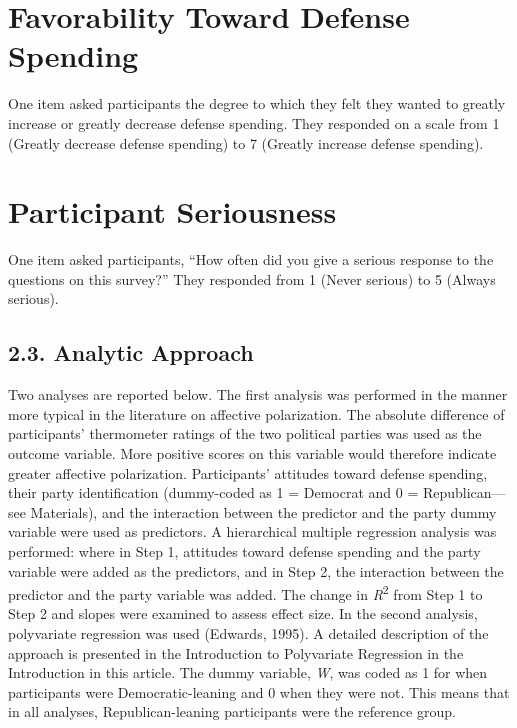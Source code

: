 \documentclass[authordate, meta, issue]{jote-new-article}
\begin{document}
	\section{\textbf{Favorability Toward Defense Spending}}



	One item asked participants the degree to which they felt they wanted to greatly increase or greatly decrease defense spending. They responded on a scale from 1 (Greatly decrease defense spending) to 7 (Greatly increase defense spending).



	\section{\textbf{Participant Seriousness}}



	One item asked participants, “How often did you give a serious response to the questions on this survey?” They responded from 1 (Never serious) to 5 (Always serious).



	\subsection{2.3. Analytic Approach}



	Two analyses are reported below. The first analysis was performed in the manner more typical in the literature on affective polarization. The absolute difference of participants' thermometer ratings of the two political parties was used as the outcome variable. More positive scores on this variable would therefore indicate greater affective polarization. Participants' attitudes toward defense spending, their party identification (dummy-coded as 1 = Democrat and 0 = Republican—see Materials), and the interaction between the predictor and the party dummy variable were used as predictors. A hierarchical multiple regression analysis was performed: where in Step 1, attitudes toward defense spending and the party variable were added as the predictors, and in Step 2, the interaction between the predictor and the party variable was added. The change in \emph{R}\textsuperscript{2} from Step 1 to Step 2 and slopes were examined to assess effect size. In the second analysis, polyvariate regression was used (Edwards, 1995). A detailed description of the approach is presented in the Introduction to Polyvariate Regression in the Introduction in this article. The dummy variable, \emph{W}, was coded as 1 for when participants were Democratic-leaning and 0 when they were not. This means that in all analyses, Republican-leaning participants were the reference group.
\end{document}
